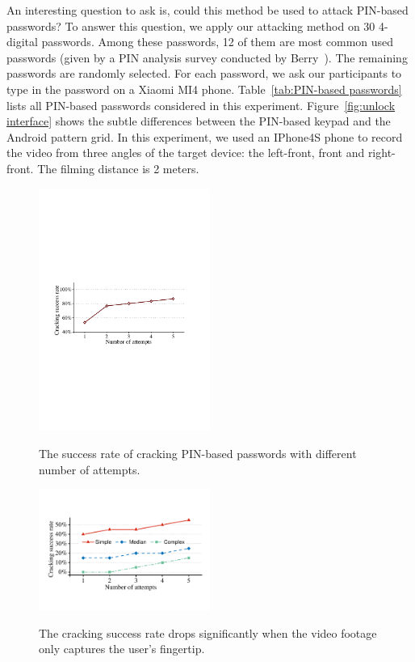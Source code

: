         An interesting question to ask is, could this method be used to attack PIN-based passwords? To answer this
        question, we apply our attacking method on 30 4-digital passwords. Among these passwords, 12 of them are most
        common used passwords (given by a PIN analysis survey conducted by Berry~\cite{Nick_pin_analysis}). The
        remaining passwords are randomly selected. For each password, we ask our participants to type in the password
        on a Xiaomi MI4 phone. Table~\ref{tab:PIN-based passwords} lists all PIN-based passwords considered in this
        experiment. Figure~\ref{fig:unlock interface} shows the subtle differences between the PIN-based keypad and the
        Android pattern grid. In this experiment, we used an IPhone4S phone to record the video from three angles of
        the target device: the
        left-front, front and right-front. The filming distance is 2 meters.

    \begin{figure}[!t]
        \centering
        \includegraphics[width=0.5\textwidth]{fig/pin_results}\\
        \caption{The success rate of cracking PIN-based passwords with different number of attempts.}
        \label{fig:pin_results}
    \end{figure}

    \begin{figure}[!t]
        \centering
        \includegraphics[width=0.5\textwidth]{fig/finger-only}\\
        \caption{The cracking success rate drops significantly when the video footage only captures the user's fingertip.}
        \label{fig:finger-only}
    \end{figure}

